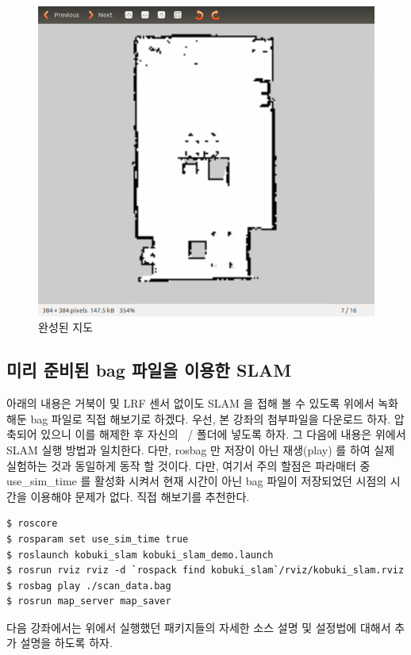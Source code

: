 \begin{figure}[h]
\centering
\includegraphics[width=0.7\columnwidth]{pictures/chapter11/slamtest_map.png}
\caption{완성된 지도}
\end{figure}

\subsection{미리 준비된 bag 파일을 이용한 SLAM}

아래의 내용은 거북이 및 LRF 센서 없이도 SLAM 을 접해 볼 수 있도록 위에서 녹화해둔 bag 파일로 직접 해보기로 하겠다. 우선, 본 강좌의 첨부파일을 다운로드 하자. 압축되어 있으니 이를 해제한 후 자신의 ~/ 폴더에 넣도록 하자. 그 다음에 내용은 위에서 SLAM 실행 방법과 일치한다. 다만, rosbag 만 저장이 아닌 재생(play) 를 하여 실제 실험하는 것과 동일하게 동작 할 것이다. 다만, 여기서 주의 할점은 파라매터 중 use\_sim\_time 를 활성화 시켜서 현재 시간이 아닌 bag 파일이 저장되었던 시점의 시간을 이용해야 문제가 없다. 직접 해보기를 추천한다.

\vspace{\baselineskip}
\begin{lstlisting}[language=ROS]
$ roscore
$ rosparam set use_sim_time true
$ roslaunch kobuki_slam kobuki_slam_demo.launch
$ rosrun rviz rviz -d `rospack find kobuki_slam`/rviz/kobuki_slam.rviz
$ rosbag play ./scan_data.bag
$ rosrun map_server map_saver
\end{lstlisting}

다음 강좌에서는 위에서 실행했던 패키지들의 자세한 소스 설명 및 설정법에 대해서 추가 설명을 하도록 하자.

